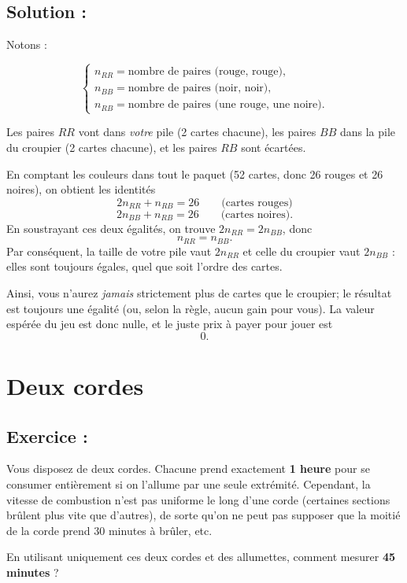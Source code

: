 \subsection*{Solution :}

Notons :

\[
\begin{cases}
n_{RR}=\text{nombre de paires (rouge, rouge)},\\
n_{BB}=\text{nombre de paires (noir, noir)},\\
n_{RB}=\text{nombre de paires (une rouge, une noire)}.    
\end{cases}
\]

Les paires \(RR\) vont dans \emph{votre} pile (2 cartes chacune), les paires \(BB\) dans la pile du croupier (2 cartes chacune), et les paires \(RB\) sont écartées.

En comptant les couleurs dans tout le paquet (52 cartes, donc 26 rouges et 26 noires), on obtient les identités
\[
2n_{RR}+n_{RB}=26 \qquad\text{(cartes rouges)}
\]
\[
2n_{BB}+n_{RB}=26 \qquad\text{(cartes noires)}.
\]
En soustrayant ces deux égalités, on trouve \(2n_{RR}=2n_{BB}\), donc
\[
n_{RR}=n_{BB}.
\]
Par conséquent, la taille de votre pile vaut \(2n_{RR}\) et celle du croupier vaut \(2n_{BB}\) : elles sont toujours égales, quel que soit l’ordre des cartes.

Ainsi, vous n’aurez \emph{jamais} strictement plus de cartes que le croupier; le résultat est toujours une égalité (ou, selon la règle, aucun gain pour vous). La valeur espérée du jeu est donc nulle, et le juste prix à payer pour jouer est
\[
\boxed{0}.
\]


\section{Deux cordes}

\subsection*{Exercice :}

\begin{exerciseBox}
Vous disposez de deux cordes. Chacune prend exactement \textbf{1 heure} pour se consumer entièrement si on l’allume par une seule extrémité.  
Cependant, la vitesse de combustion n’est pas uniforme le long d’une corde (certaines sections brûlent plus vite que d’autres), de sorte qu’on ne peut pas supposer que la moitié de la corde prend 30 minutes à brûler, etc.  

En utilisant uniquement ces deux cordes et des allumettes, comment mesurer \textbf{45 minutes} ?
    
\end{exerciseBox}


